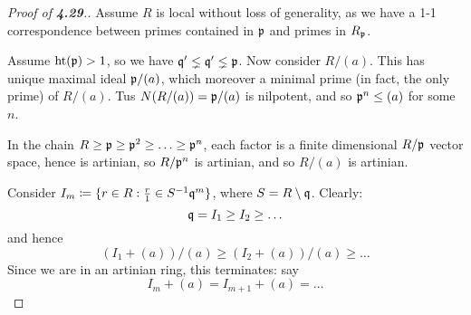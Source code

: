 \documentclass[10pt,a4paper]{article}
\begin{document}
\begin{proof}[Proof of \textbf{4.29}.]
  Assume $R$ is local without loss of generality, as we have a 1-1 correspondence between primes contained in $\mathfrak{p}$ and primes in $R_{\mathfrak{p}}$.

  Assume $\operatorname{ht}(\mathfrak{p}) > 1$, so we have $\mathfrak{q}'\lneq \mathfrak{q}' \lneq \mathfrak{p}$. Now consider $R/(a)$. This has unique maximal ideal $\mathfrak{p}/(a)$, which moreover a minimal prime (in fact, the only prime) of $R/(a)$. Tus $N(R/(a)) = \mathfrak{p}/(a)$ is nilpotent, and so $\mathfrak{p}^n\leq (a)$ for some $n$.

  In the chain $R \geq \mathfrak{p} \geq \mathfrak{p}^2 \geq \ldots \geq \mathfrak{p}^n$, each factor is a finite dimensional $R/\mathfrak{p}$ vector space, hence is artinian, so $R/\mathfrak{p}^n$ is artinian, and so $R/(a)$ is artinian.

  Consider $I_m \coloneqq \{r \in R : \frac{r}{1} \in S^{-1}\mathfrak{q}^m\}$, where $S = R \setminus \mathfrak{q}$. Clearly:
  \[\mathfrak{q} = I_1 \geq I_2 \geq \ldots \]
  and hence
  \[(I_1 + (a))/(a) \geq (I_2+(a))/(a) \geq \ldots\]
  Since we are in an artinian ring, this terminates: say
  \[I_m+(a) = I_{m+1} + (a) = \ldots\]
\end{proof}
\end{document}

